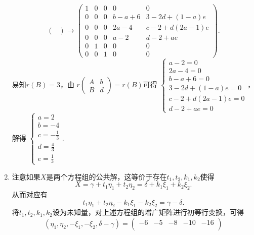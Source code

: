 \begin{enumerate}
$$\begin{pmatrix}
        \end{pmatrix}\rightarrow
        \begin{pmatrix}
            1 & 0 & 0 & 0 & 0 \\
            0 & 0 & 0 & b-a+6 & 3-2d+(1-a)e \\
            0 & 0 & 0 & 2a-4 & c-2+d(2a-1)e \\
            0 & 0 & 0 & a-2 & d-2+ae \\
            0 & 1 & 0 & 0 & 0 \\
            0 & 0 & 1 & 0 & 0
        \end{pmatrix}.$$
        易知$r(B)=3$，由
        $r\begin{pmatrix}
            A & b \\
            B & d
        \end{pmatrix}=r(B)$可得
        $\begin{cases}
            a-2=0 \\
            2a-4=0 \\
            b-a+6=0 \\
            3-2d+(1-a)e=0 \\
            c-2+d(2a-1)e=0 \\
            d-2+ae=0
        \end{cases}$，解得
        $\begin{cases}
            a=2 \\
            b=-4 \\
            c=-\frac 13 \\
            d=\frac 43 \\
            e=\frac 13
        \end{cases}.$
    \item
        注意如果$X$是两个方程组的公共解，这等价于存在$t_1,t_2,k_1,k_2$使得
        \begin{equation*}
            X=\gamma+t_1\eta_1+t_2\eta_2=\delta+k_1\xi_1+k_2\xi_2.
        \end{equation*}
        从而对应有
        \begin{equation*}
            t_1\eta_1+t_2\eta_2-k_1\xi_1-k_2\xi_2=\gamma-\delta.
        \end{equation*}
        将$t_1,t_2,k_1,k_2$设为未知量，对上述方程组的增广矩阵进行初等行变换，可得
        \begin{equation*}
            (\eta_1,\eta_2,-\xi_1,-\xi_2,\delta-\gamma)=
            \begin{pmatrix}
                -6 & -5 & -8 & -10 & -16 \\

\end{pmatrix}
\end{equation*}
\end{enumerate}

